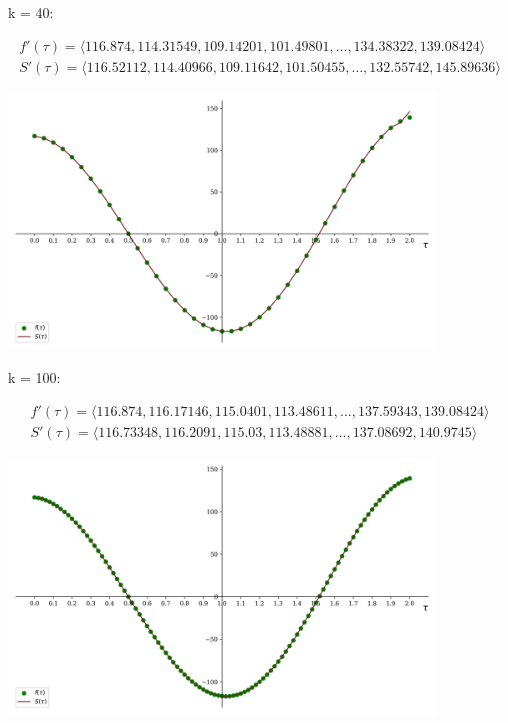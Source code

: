 \documentclass[a4paper, 14pt]{extarticle}
\begin{document}
\vfill

\newpage

k = 40:

\begin{gather*}
    f'(\tau) = \langle 116.874, 114.31549, 109.14201, 101.49801, \dots, 134.38322, 139.08424 \rangle \\
    S'(\tau) = \langle 116.52112, 114.40966, 109.11642, 101.50455, \dots, 132.55742, 145.89636 \rangle 
\end{gather*}
 
\begin{center}
    \includegraphics[width=0.85\textwidth]{mainDiff_x_splineDiff_40}
\end{center}

k = 100:

\begin{gather*}
    f'(\tau) = \langle 116.874, 116.17146, 115.0401, 113.48611, \dots, 137.59343, 139.08424 \rangle \\
    S'(\tau) = \langle 116.73348, 116.2091, 115.03, 113.48881, \dots, 137.08692, 140.9745\rangle 
\end{gather*}
 
\begin{center}
    \includegraphics[width=0.85\textwidth]{mainDiff_x_splineDiff_100}
\end{center}
\end{document}
